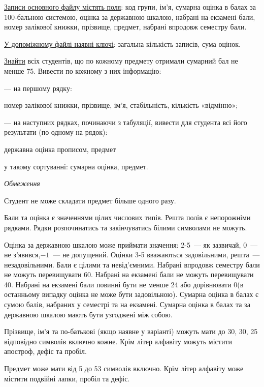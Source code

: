 \documentclass[11pt, ukrainian]{article}
\begin{document}
\underline{Записи основного файлу містять поля}: код групи, ім’я, сумарна оцінка в балах за 100-бальною системою, оцінка за державною шкалою, набрані на екзамені бали, номер залікової книжки, прізвище, предмет, набрані впродовж семестру бали.

\underline{У допоміжному файлі наявні ключі}: загальна кількість записів, сума оцінок.

\underline{Знайти} всіх студентів, що по кожному предмету отримали сумарний бал не менше 75. Вивести по кожному з них інформацію:\par
{\noindent}--- на першому рядку:\par
номер залікової книжки, прізвище, ім’я, стабільність, кількість «відмінно»;

{\noindent}--- на наступних рядках, починаючи з табуляції, вивести для студента всі його результати (по одному на рядок):\par
державна оцінка прописом, предмет

{\noindent}у такому сортуванні: сумарна оцінка, предмет.


\bigskip\textit{Обмеження}

Студент не може складати предмет більше одного разу.

Бали та оцінка є значеннями цілих числових типів. Решта полів є непорожніми рядками.
Рядки розпочинатись та закінчуватись білими символами не можуть.

Оцінка за державною шкалою може приймати значення: 2-5~--- як зазвичай, 0~--- не з’явився,$-1$~--- не допущений. 
Оцінки 3-5 вважаються задовільними, решта~--- незадовільними. 
Бали є цілими та невід’ємними.
Набрані впродовж семестру бали не можуть перевищувати 60. 
Набрані на екзамені бали не можуть перевищувати 40. 
Набрані на екзамені бали повинні бути не менше 24 або дорівнювати 0(в останньому випадку оцінка не може бути задовільною). 
Сумарна оцінка в балах є сумою балів, набраних у семестрі та на екзамені.
Сумарна оцінка в балах та за державною шкалою мають бути узгоджені між собою.

Прізвище, ім’я та по-батькові (якщо наявне у варіанті) можуть мати до 30, 30, 25 відповідно символів включно кожне. 
Крім літер алфавіту можуть містити апостроф, дефіс та пробіл.

Предмет може мати від 5 до 53 символів включно. 
Крім літер алфавіту може містити подвійні лапки, пробіл та дефіс.
\end{document}
